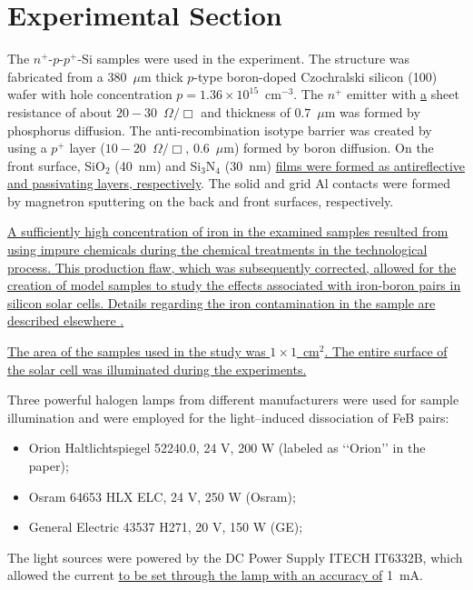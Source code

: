 \documentclass{WileyMSP-template}
\begin{document}
\section{Experimental Section}
\label{SecExp}

The $n^+$-$p$-$p^+$-Si samples were used in the experiment.
The structure was fabricated from a 380~$\mu$m thick $p$-type boron-doped
Czochralski silicon (100) wafer with hole concentration $p=1.36\times10^{15}$~cm$^{-3}$.
The $n^+$ emitter with \textcolor[rgb]{0.00,0.07,1.00}{\uline{a}} sheet resistance of about $20-30$~$\Omega/\Box$
and  thickness of $0.7$~$\mu$m was formed by phosphorus diffusion.
The anti-recombination isotype barrier was created by using a $p^+$
layer ($10-20$~$\Omega/\Box$, $0.6$~$\mu$m) formed by boron diffusion.
On the front surface, SiO$_2$ (40~nm) and Si$_3$N$_4$ (30~nm) \textcolor[rgb]{0.00,0.07,1.00}{\uline{films were formed as antireflective and passivating layers, respectively}}.
The solid and grid Al contacts were formed by magnetron sputtering on the back and front surfaces, respectively.

\textcolor[rgb]{0.00,0.07,1.00}{\uline{A sufficiently high concentration of iron in the examined samples resulted from using impure chemicals during the chemical treatments in the technological process.
This production flaw, which was subsequently corrected, allowed for the creation of model samples to study the effects associated with iron-boron pairs in silicon solar cells.
Details regarding the iron contamination in the sample are described elsewhere \cite{Olikh2021JAP}.}}

\textcolor[rgb]{0.00,0.07,1.00}{\uline{The area of the samples used in the study was $1\times1$~cm$^2$.
The entire surface of the solar cell was illuminated during the experiments.}}

Three powerful halogen lamps from different manufacturers were used for sample illumination and were employed for the light--induced dissociation of FeB pairs:
\begin{itemize}
  \item Orion Haltlichtspiegel 52240.0, 24 V, 200 W (labeled as ‘‘Orion’’ in the paper);
  \item Osram 64653 HLX ELC, 24 V, 250 W (Osram);
  \item General Electric 43537 H271, 20 V, 150 W (GE);
\end{itemize}
The light sources were powered by the DC Power Supply ITECH IT6332B,
which allowed the current \textcolor[rgb]{0.00,0.07,1.00}{\uline{to be set through the lamp with an accuracy of}} 1~mA.
\end{document}
